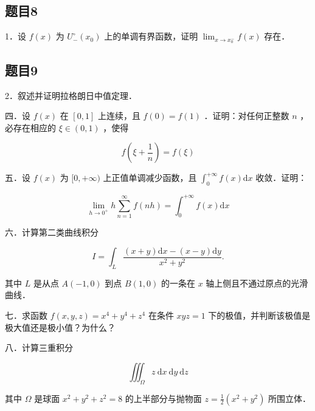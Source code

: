 \documentclass{article}
\begin{document}
\subsection{题目8}
1．设 \(f(x)\) 为 \(U_{-}^{\circ}\left(x_{0}\right)\) 上的单调有界函数，证明 \(\lim _{x \rightarrow x_{0}^{-}} f(x)\) 存在．

\subsection{题目9}
2．叙述并证明拉格朗日中值定理．

四．设 \(f(x)\) 在 \([0,1]\) 上连续，且 \(f(0)=f(1)\) ．证明：对任何正整数 \(n\) ，必存在相应的 \(\xi \in(0,1)\) ，使得

\[
f\left(\xi+\frac{1}{n}\right)=f(\xi)
\]

五．设 \(f(x)\) 为 \([0,+\infty)\) 上正值单调减少函数，且 \(\int_{0}^{+\infty} f(x) \mathrm{d} x\) 收敛．证明：

\[
\lim _{h \rightarrow 0^{+}} h \sum_{n=1}^{\infty} f(n h)=\int_{0}^{+\infty} f(x) \mathrm{d} x
\]

六．计算第二类曲线积分

\[
I=\int_{L} \frac{(x+y) \mathrm{d} x-(x-y) \mathrm{d} y}{x^{2}+y^{2}} .
\]

其中 \(L\) 是从点 \(A(-1,0)\) 到点 \(B(1,0)\) 的一条在 \(x\) 轴上侧且不通过原点的光滑曲线．

七．求函数 \(f(x, y, z)=x^{4}+y^{4}+z^{4}\) 在条件 \(x y z=1\) 下的极值，并判断该极值是极大值还是极小值？为什么？

八．计算三重积分

\[
\iiint_{\Omega} z \mathrm{~d} x \mathrm{~d} y \mathrm{~d} z
\]

其中 \(\Omega\) 是球面 \(x^{2}+y^{2}+z^{2}=8\) 的上半部分与抛物面 \(z=\frac{1}{2}\left(x^{2}+y^{2}\right)\) 所围立体．
\end{document}

